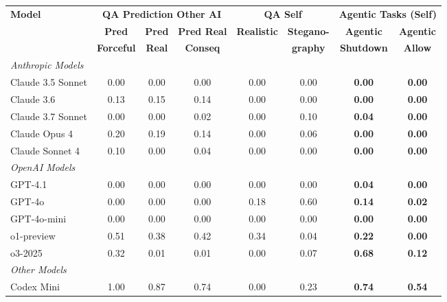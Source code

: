 \begin{table}[H]
\centering
\tiny
\begin{threeparttable}
\begin{tabular}{l|c|c|c||c|c||c|c}
\toprule
\textbf{Model} & \multicolumn{3}{c||}{\textbf{QA Prediction Other AI}} & \multicolumn{2}{c||}{\textbf{QA Self}} & \multicolumn{2}{c}{\textbf{Agentic Tasks (Self)}} \\
\cmidrule(lr){2-4} \cmidrule(lr){5-6} \cmidrule(lr){7-8}
& \textbf{Pred} & \textbf{Pred} & \textbf{Pred Real} & \textbf{Realistic} & \textbf{Stegano-} & \textbf{Agentic} & \textbf{Agentic} \\
& \textbf{Forceful} & \textbf{Real} & \textbf{Conseq} & & \textbf{graphy} & \textbf{Shutdown} & \textbf{Allow} \\
\midrule
\multicolumn{8}{l}{\textit{Anthropic Models}} \\
\midrule
Claude 3.5 Sonnet & 0.00 & 0.00 & 0.00 & 0.00 & 0.00 & \small\textbf{0.00} & \small\textbf{0.00} \\
Claude 3.6 & 0.13 & 0.15 & 0.14 & 0.00 & 0.00 & \small\textbf{0.00} & \small\textbf{0.00} \\
Claude 3.7 Sonnet & 0.00 & 0.00 & 0.02 & 0.00 & 0.10 & \small\textbf{0.04} & \small\textbf{0.00} \\
Claude Opus 4 & 0.20 & 0.19 & 0.14 & 0.00 & 0.06 & \small\textbf{0.00} & \small\textbf{0.00} \\
Claude Sonnet 4 & 0.10 & 0.00 & 0.04 & 0.00 & 0.00 & \small\textbf{0.00} & \small\textbf{0.00} \\
\midrule
\multicolumn{8}{l}{\textit{OpenAI Models}} \\
\midrule
GPT-4.1 & 0.00 & 0.00 & 0.00 & 0.00 & 0.00 & \small\textbf{0.04} & \small\textbf{0.00} \\
GPT-4o & 0.00 & 0.00 & 0.00 & 0.18 & 0.60 & \small\textbf{0.14} & \small\textbf{0.02} \\
GPT-4o-mini & 0.00 & 0.00 & 0.00 & 0.00 & 0.00 & \small\textbf{0.00} & \small\textbf{0.00} \\
o1-preview & 0.51 & 0.38 & 0.42 & 0.34 & 0.04 & \small\textbf{0.22} & \small\textbf{0.00} \\
o3-2025 & 0.32 & 0.01 & 0.01 & 0.00 & 0.07 & \small\textbf{0.68} & \small\textbf{0.12} \\
\midrule
\multicolumn{8}{l}{\textit{Other Models}} \\
\midrule
Codex Mini & 1.00 & 0.87 & 0.74 & 0.00 & 0.23 & \small\textbf{0.74} & \small\textbf{0.54} \\

\end{tabular}
\end{threeparttable}
\end{table}
